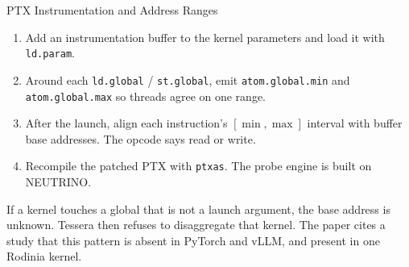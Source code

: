 \begin{frame}[plain,label=mm_hx_place_01]
\end{frame}

\begin{frame}[plain,label=mm_hx_scheddeep_01]
\end{frame}

\begin{frame}[plain,label=mm_ts_kern_01]
\end{frame}

\begin{frame}[plain,label=mm_ts_phase_01]
\end{frame}

\begin{frame}[t,label=mm_ts_ptx_01]{PTX Instrumentation and Address Ranges}

  \par
  \vspace{.08cm}
  \begin{enumerate}\footnotesize
    \setlength{\itemsep}{.07cm}
    \item Add an instrumentation buffer to the kernel parameters and load it with \texttt{ld.param}.
    \item Around each \texttt{ld.global} / \texttt{st.global}, emit \texttt{atom.global.min} and \texttt{atom.global.max} so threads agree on one range.
    \item After the launch, align each instruction's \([\min,\max]\) interval with buffer base addresses. The opcode says read or write.
    \item Recompile the patched PTX with \texttt{ptxas}. The probe engine is built on NEUTRINO.
  \end{enumerate}
  \vspace{.06cm}
  {\footnotesize If a kernel touches a global that is not a launch argument, the base address is unknown. Tessera then refuses to disaggregate that kernel. The paper cites a study that this pattern is absent in PyTorch and vLLM, and present in one Rodinia kernel.}\par
  \vspace{.05cm}
\end{frame}

